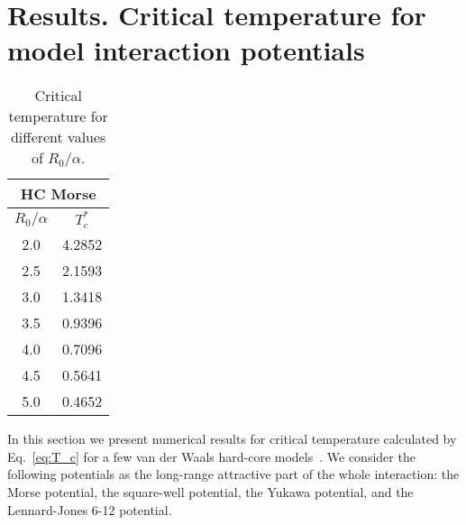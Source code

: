 \section{\label{sec:results}Results. Critical temperature for model interaction potentials}

\begin{table}[h]
	\caption{Critical temperature for different values of $R_0/\alpha$.}
	\begin{center}
		\begin{tabular}{|c|c|}
			\hline
			\multicolumn{2}{|c|}{HC Morse} \\
			\hline
			$R_0/\alpha$ \quad & $T_c^*$ \\
			\hline
			2.0  & 4.2852 \\
			2.5  & 2.1593 \\
			3.0  & 1.3418 \\
			3.5  & 0.9396 \\
			4.0  & 0.7096 \\
			4.5  & 0.5641 \\
			5.0  & 0.4652 \\
			\hline
		\end{tabular}
	\end{center}
	\label{tab:morse_temp_cr}
\end{table}

In this section we present numerical results for critical temperature calculated by Eq.~\eqref{eq:T_c} for a few van der Waals hard-core models~\cite{KreiciNezbeda2012}. We consider the following potentials as the long-range attractive part of the whole interaction: the Morse potential, the square-well potential, the Yukawa potential, and the Lennard-Jones 6-12 potential. 

